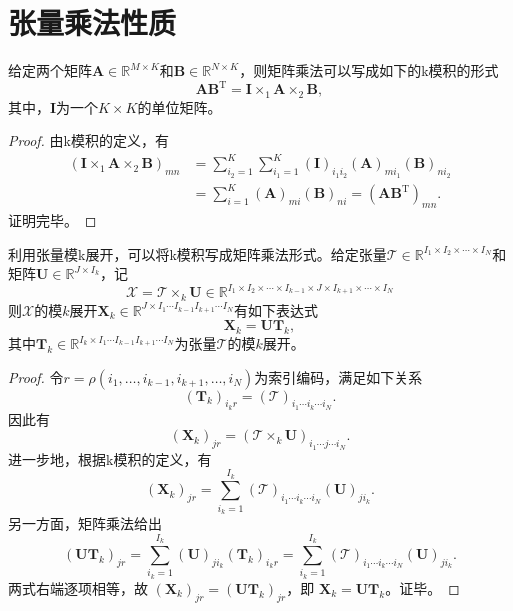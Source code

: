 \chapter{张量乘法性质}

\begin{property}\label{prop:apx_kron_matmul}
    给定两个矩阵\( \mathbf{A} \in \mathbb{R}^{M \times K} \)和\( \mathbf{B} \in \mathbb{R}^{N \times K} \)，则矩阵乘法可以写成如下的k模积的形式
    \[
        \mathbf{A} \mathbf{B}^{\mathrm{T}} = \mathbf{I} \times_1 \mathbf{A} \times_2 \mathbf{B},
    \]
    其中，\( \mathbf{I} \)为一个\( K \times K \)的单位矩阵。
\end{property}
\begin{proof}
    由k模积的定义，有
    \[
        \begin{split}
            \left( \mathbf{I} \times_1 \mathbf{A} \times_2 \mathbf{B} \right)_{mn} & = \sum_{i_2=1}^K \sum_{i_1=1}^{K} (\mathbf{I})_{i_1 i_2} (\mathbf{A})_{mi_1} (\mathbf{B})_{ni_2} \\
                                                                                   & = \sum_{i=1}^K (\mathbf{A})_{mi} (\mathbf{B})_{ni} = (\mathbf{A} \mathbf{B}^{\mathrm{T}})_{mn}.
        \end{split}
    \]
    证明完毕。
\end{proof}

\begin{property}\label{prop:apx_kron_kprod}
    利用张量模k展开，可以将k模积写成矩阵乘法形式。给定张量\( \mathcal{T} \in \mathbb{R}^{I_1 \times I_2 \times \cdots \times I_N} \)和矩阵\( \mathbf{U} \in \mathbb{R}^{J \times I_k} \)，记
    \[
        \mathcal{X} = \mathcal{T} \times_k \mathbf{U} \in \mathbb{R}^{I_1 \times I_2 \times \cdots \times I_{k-1} \times J \times I_{k+1} \times \cdots \times I_N}
    \]
    则\( \mathcal{X} \)的模\( k \)展开\( \mathbf{X}_k \in \mathbb{R}^{J \times I_1 \cdots I_{k-1} I_{k+1} \cdots I_N}\)有如下表达式
    \[
        \mathbf{X}_k = \mathbf{U} \mathbf{T}_k,
    \]
    其中\( \mathbf{T}_k \in \mathbb{R}^{I_k \times I_1 \cdots I_{k-1} I_{k+1} \cdots I_N} \)为张量\( \mathcal{T} \)的模\( k \)展开。
\end{property}
\begin{proof}
    令\( r =\rho(i_1,\ldots,i_{k-1},i_{k+1},\ldots,i_N)\)为索引编码，满足如下关系
    \[
        (\mathbf{T}_k)_{i_k r} = (\mathcal{T})_{i_1\cdots i_k\cdots i_N}.
    \]
    因此有
    \[
        (\mathbf{X}_k)_{jr}=(\mathcal{T}\times_k \mathbf{U})_{i_1\cdots j\cdots i_N}.
    \]
    进一步地，根据k模积的定义，有
    \[
        (\mathbf{X}_k)_{jr} = \sum_{i_k=1}^{I_k} (\mathcal{T})_{i_1\cdots i_k\cdots i_N} (\mathbf{U})_{ji_k}.
    \]
    另一方面，矩阵乘法给出
    \[
        (\mathbf{U}\mathbf{T}_k)_{j r} = \sum_{i_k=1}^{I_k} (\mathbf{U})_{j i_k} (\mathbf{T}_k)_{i_k r} = \sum_{i_k=1}^{I_k} (\mathcal{T})_{i_1\cdots i_k\cdots i_N} (\mathbf{U})_{ji_k}.
    \]
    两式右端逐项相等，故 $(\mathbf{X}_k)_{j r}=(\mathbf{U}\mathbf{T}_k)_{j r}$，即
    $\mathbf{X}_k=\mathbf{U}\mathbf{T}_k$。证毕。
\end{proof}


